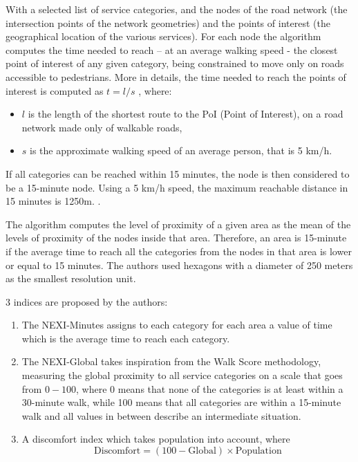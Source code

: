 With a selected list of service categories, and the nodes of the road network (the intersection points of the network geometries) and the points of interest (the geographical location of the various services). For each node the algorithm computes the time needed to reach – at an average walking speed - the closest point of interest of any given category, being constrained to move only on roads accessible to pedestrians. More in details, the time needed to reach the points of interest is computed as $t = l / s$ , where:

\begin{itemize}
\item $l$ is the length of the shortest route to the PoI (Point of Interest), on a road network made only of walkable roads,
\item $s$ is the approximate walking speed of an average person, that is 5 km/h.
\end{itemize}

If all categories can be reached within 15 minutes, the node is then considered to be a 15-minute node. Using a 5 km/h speed, the maximum reachable distance in 15 minutes is 1250m. .

The algorithm computes the level of proximity of a given area as the mean of the levels of proximity of the nodes inside that area. Therefore, an area is 15-minute if the average time to reach all the categories from the nodes in that area is lower or equal to 15 minutes. The authors used hexagons with a diameter of 250 meters as the smallest resolution unit.

3 indices are proposed by the authors:

\begin{enumerate}
\item The NEXI-Minutes assigns to each category for each area a value of time which is the average time to reach each category.
\item The NEXI-Global takes inspiration from the Walk Score methodology, measuring the global proximity to all service categories on a scale that goes from $0 - 100$, where 0 means that none of the categories is at least within a 30-minute walk, while 100 means that all categories are within a 15-minute walk and all values in between describe an intermediate situation.
\item A discomfort index which takes population into account, where
$$\text{Discomfort} = (100-\text{Global})\times\text{Population}$$
\end{enumerate}

